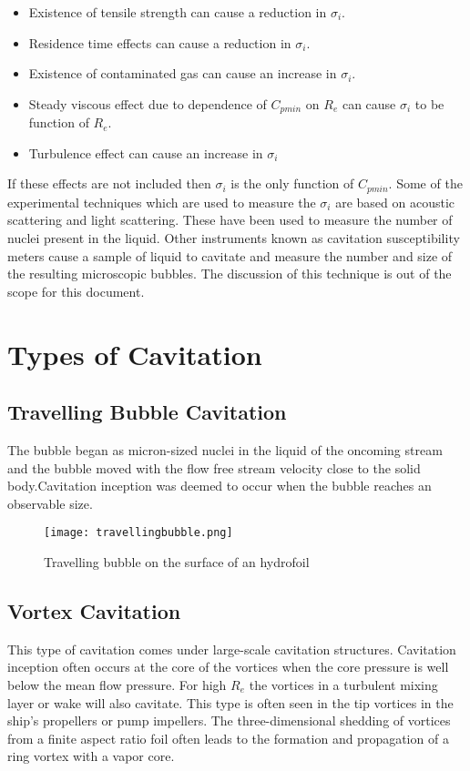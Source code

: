 \begin{itemize}
  \item Existence of tensile strength can cause a reduction in
    ${\sigma}_i$.
  \item Residence time effects can cause a reduction in ${\sigma}_i$.
  \item Existence of contaminated gas can cause an increase in
    ${\sigma}_i$.
  \item Steady viscous effect due to dependence of $C_{pmin}$ on $R_e$
    can cause ${\sigma}_i$ to be function of $R_e$.
  \item Turbulence effect can cause an increase in ${\sigma}_i$
\end{itemize}

If  these  effects are not included then ${\sigma}_i$ is the only function
of $C_{pmin}$. Some of the experimental techniques which are used to
measure the ${\sigma}_i$ are based on acoustic scattering
and light scattering. These have been used to measure the number of nuclei
present in the liquid. Other instruments known as cavitation
susceptibility meters cause a sample of liquid to cavitate and measure
the number and size of the resulting microscopic bubbles. The
discussion of this technique is out of the scope for this document.


\section{Types of Cavitation}

\subsection{Travelling Bubble Cavitation}
The bubble began as micron-sized nuclei in the liquid of the oncoming
stream and the bubble moved with the flow free stream velocity close
to the solid body.Cavitation inception was deemed to occur when the
bubble reaches an observable size.

\begin{figure}[H]
  \centering
  \texttt{[image: travellingbubble.png]}
  \caption{Travelling bubble on the surface of an hydrofoil \cite{FundamentalsofCavitation.2004}}
  \label{fig:fig6}
\end{figure}

\subsection{Vortex Cavitation}
This type of cavitation comes under large-scale cavitation
structures. Cavitation inception often occurs at the core of the
vortices when the core pressure is well below the mean flow pressure.
For high $R_e$ the vortices in a turbulent mixing layer or wake will
also cavitate. This type is often seen in the tip vortices in the
ship's propellers or pump impellers.  The three-dimensional shedding
of vortices from a finite aspect ratio foil often leads to the
formation and propagation of a ring vortex with a vapor core.

